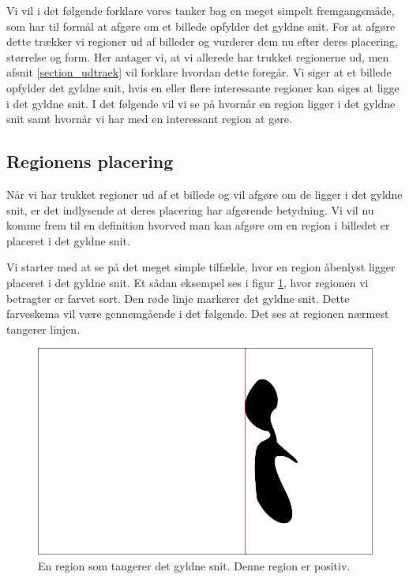 {
\def\imgscale{0.34}

\textsf{Vi vil i det følgende forklare vores tanker bag en meget simpelt
fremgangsmåde, som har til formål at afgøre om et billede opfylder det
gyldne snit. For at afgøre dette trækker vi regioner ud af billeder og
vurderer dem nu efter deres placering, størrelse og form. Her antager
vi, at vi allerede har trukket regionerne ud, men afsnit
\ref{section_udtraek} vil forklare hvordan dette foregår. Vi siger at et
billede opfylder det gyldne snit, hvis en eller flere interessante
regioner kan siges at ligge i det gyldne snit.  I det følgende vil vi se
på hvornår en region ligger i det gyldne snit samt hvornår vi har med en
interessant region at gøre.
}

\subsection{Regionens placering}
Når vi har trukket regioner ud af et billede og vil afgøre om de ligger
i det gyldne snit, er det indlysende at deres placering har afgørende
betydning.  Vi vil nu komme frem til en definition hvorved man kan
afgøre om en region i billedet er placeret i det gyldne snit.

Vi starter med at se på det meget simple tilfælde, hvor en region
åbenlyst ligger placeret i det gyldne snit.  Et sådan eksempel ses i
figur \ref{pos_naiv_1}, hvor regionen vi betragter er farvet sort.  Den
røde linje markerer det gyldne snit.  Dette farveskema vil være
gennemgående i det følgende.  Det ses at regionen nærmest tangerer
linjen.

\begin{figure}[h]
    \begin{center}
        \includegraphics[scale=\imgscale,angle=0]{afsnit/vores_implementation/billeder/naiv_algoritme/naiv_positiv_blob_1}
    \end{center}
    \caption[En positiv region]{En region som tangerer det gyldne snit.
    Denne region er positiv.}
    \label{pos_naiv_1}
\end{figure}

}
